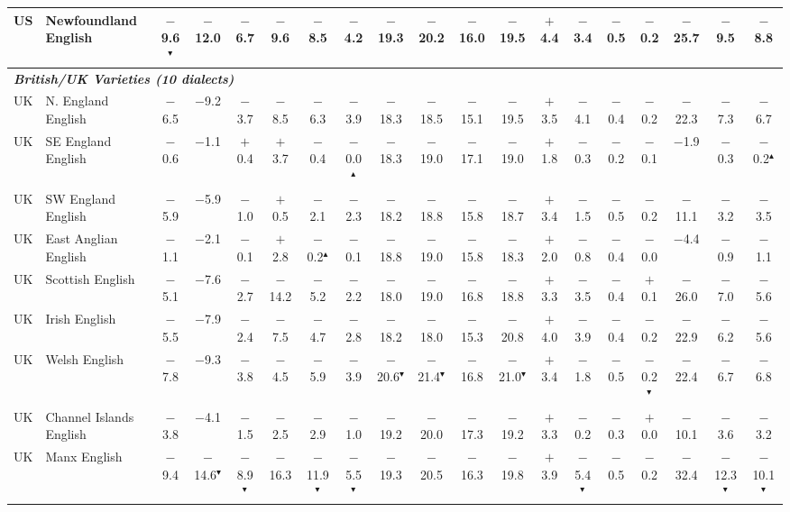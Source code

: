\begin{table}[t]
\begin{tabular}{llccccccccccccccccc}
US & Newfoundland English & $-$9.6$^\blacktriangledown$ & $-$12.0 & $-$6.7 & $-$9.6 & $-$8.5 & $-$4.2 & $-$19.3 & $-$20.2 & $-$16.0 & $-$19.5 & $+$4.4 & $-$3.4 & $-$0.5 & $-$0.2 & $-$25.7 & $-$9.5 & $-$8.8 \\
\midrule
\multicolumn{19}{l}{\textit{\textbf{British/UK Varieties (10 dialects)}}} \\
UK & N. England English & $-$6.5 & $-$9.2 & $-$3.7 & $-$8.5 & $-$6.3 & $-$3.9 & $-$18.3 & $-$18.5 & $-$15.1 & $-$19.5 & $+$3.5 & $-$4.1 & $-$0.4 & $-$0.2 & $-$22.3 & $-$7.3 & $-$6.7 \\
UK & SE England English & $-$0.6 & $-$1.1 & $+$0.4 & $+$3.7 & $-$0.4 & $-$0.0$^\blacktriangle$ & $-$18.3 & $-$19.0 & $-$17.1 & $-$19.0 & $+$1.8 & $-$0.3 & $-$0.2 & $-$0.1 & $-$1.9 & $-$0.3 & $-$0.2$^\blacktriangle$ \\
UK & SW England English & $-$5.9 & $-$5.9 & $-$1.0 & $+$0.5 & $-$2.1 & $-$2.3 & $-$18.2 & $-$18.8 & $-$15.8 & $-$18.7 & $+$3.4 & $-$1.5 & $-$0.5 & $-$0.2 & $-$11.1 & $-$3.2 & $-$3.5 \\
UK & East Anglian English & $-$1.1 & $-$2.1 & $-$0.1 & $+$2.8 & $-$0.2$^\blacktriangle$ & $-$0.1 & $-$18.8 & $-$19.0 & $-$15.8 & $-$18.3 & $+$2.0 & $-$0.8 & $-$0.4 & $-$0.0 & $-$4.4 & $-$0.9 & $-$1.1 \\
UK & Scottish English & $-$5.1 & $-$7.6 & $-$2.7 & $-$14.2 & $-$5.2 & $-$2.2 & $-$18.0 & $-$19.0 & $-$16.8 & $-$18.8 & $+$3.3 & $-$3.5 & $-$0.4 & $+$0.1 & $-$26.0 & $-$7.0 & $-$5.6 \\
UK & Irish English & $-$5.5 & $-$7.9 & $-$2.4 & $-$7.5 & $-$4.7 & $-$2.8 & $-$18.2 & $-$18.0 & $-$15.3 & $-$20.8 & $+$4.0 & $-$3.9 & $-$0.4 & $-$0.2 & $-$22.9 & $-$6.2 & $-$5.6 \\
UK & Welsh English & $-$7.8 & $-$9.3 & $-$3.8 & $-$4.5 & $-$5.9 & $-$3.9 & $-$20.6$^\blacktriangledown$ & $-$21.4$^\blacktriangledown$ & $-$16.8 & $-$21.0$^\blacktriangledown$ & $+$3.4 & $-$1.8 & $-$0.5 & $-$0.2$^\blacktriangledown$ & $-$22.4 & $-$6.7 & $-$6.8 \\
UK & Channel Islands English & $-$3.8 & $-$4.1 & $-$1.5 & $-$2.5 & $-$2.9 & $-$1.0 & $-$19.2 & $-$20.0 & $-$17.3 & $-$19.2 & $+$3.3 & $-$0.2 & $-$0.3 & $+$0.0 & $-$10.1 & $-$3.6 & $-$3.2 \\
UK & Manx English & $-$9.4 & $-$14.6$^\blacktriangledown$ & $-$8.9$^\blacktriangledown$ & $-$16.3 & $-$11.9$^\blacktriangledown$ & $-$5.5$^\blacktriangledown$ & $-$19.3 & $-$20.5 & $-$16.3 & $-$19.8 & $+$3.9 & $-$5.4$^\blacktriangledown$ & $-$0.5 & $-$0.2 & $-$32.4 & $-$12.3$^\blacktriangledown$ & $-$10.1$^\blacktriangledown$ \\

\end{tabular}
\end{table}
